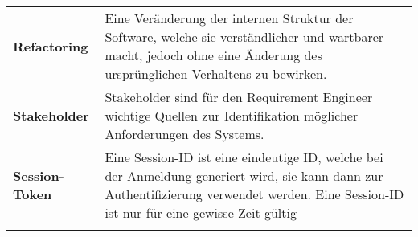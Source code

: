 \begin{longtable}{>{\raggedright}m{3cm}m{11cm}}
	\textbf{Refactoring}&
	Eine Veränderung der internen Struktur der Software, welche sie verständlicher und wartbarer macht, jedoch ohne eine Änderung des ursprünglichen Verhaltens zu bewirken.\cite{feathers2004working}\\ \addlinespace

	\textbf{Stakeholder}&
	Stakeholder sind für den Requirement Engineer wichtige Quellen zur Identifikation möglicher Anforderungen des Systems.\cite{req_eng_book}\\ \addlinespace

	\textbf{Session-Token}&
	Eine Session-ID ist eine eindeutige ID, welche bei der Anmeldung generiert wird, sie kann dann zur Authentifizierung verwendet werden. Eine Session-ID ist nur für eine gewisse Zeit gültig \\ \addlinespace

\end{longtable}
